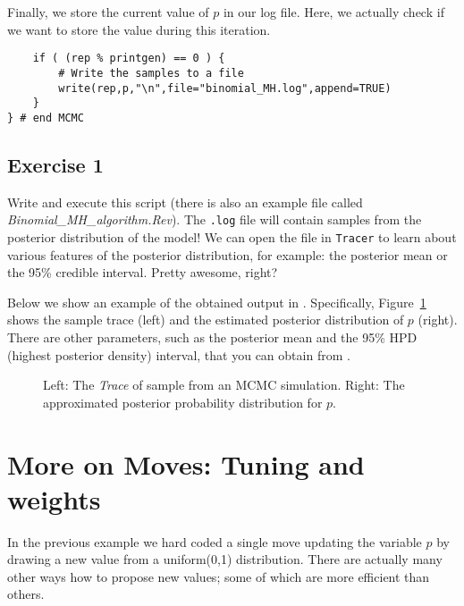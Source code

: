 Finally, we store the current value of $p$ in our log file.
Here, we actually check if we want to store the value during this iteration.
{\tt \begin{snugshade*}
\begin{lstlisting}
    if ( (rep % printgen) == 0 ) {
        # Write the samples to a file
        write(rep,p,"\n",file="binomial_MH.log",append=TRUE)
    }
} # end MCMC\end{lstlisting}
\end{snugshade*}}


\subsection{Exercise 1}

Write and execute this script (there is also an example file called \emph{Binomial\_MH\_algorithm.Rev}).
The \texttt{.log} file will contain samples from the posterior distribution of the model!
We can open the file in \texttt{Tracer} to learn about various features of the posterior distribution, for example: the posterior mean or the 95\% credible interval.
Pretty awesome, right?

Below we show an example of the obtained output in \Tracer.
Specifically, Figure~\ref{fig:mcmc_samples} shows the sample trace (left) and the estimated posterior distribution of $p$ (right).
There are other parameters, such as the posterior mean and the 95\% HPD (highest posterior density) interval, that you can obtain from \Tracer.
\begin{figure}[h!]
\centering
{}
\label{fig:mcmc_samples}
\caption{Left: The \emph{Trace} of sample from an MCMC simulation. Right: The approximated posterior probability distribution for $p$.}
\end{figure}

\section{More on Moves: Tuning and weights}

In the previous example we hard coded a single move updating the variable $p$ by drawing a new value from a uniform(0,1) distribution.
There are actually many other ways how to propose new values; some of which are more efficient than others.

